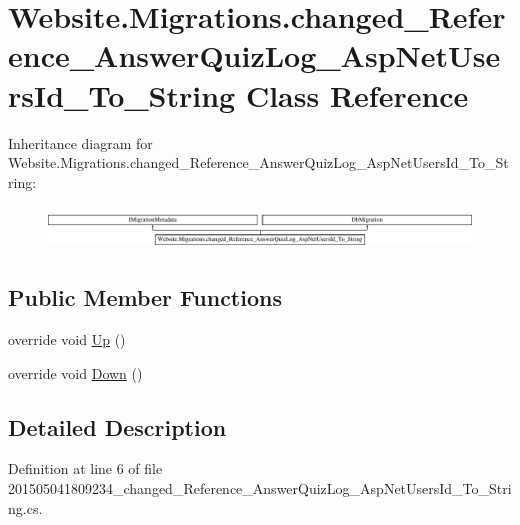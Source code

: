 \hypertarget{class_website_1_1_migrations_1_1changed___reference___answer_quiz_log___asp_net_users_id___to___string}{}\section{Website.\+Migrations.\+changed\+\_\+\+Reference\+\_\+\+Answer\+Quiz\+Log\+\_\+\+Asp\+Net\+Users\+Id\+\_\+\+To\+\_\+\+String Class Reference}
\label{class_website_1_1_migrations_1_1changed___reference___answer_quiz_log___asp_net_users_id___to___string}
Inheritance diagram for Website.\+Migrations.\+changed\+\_\+\+Reference\+\_\+\+Answer\+Quiz\+Log\+\_\+\+Asp\+Net\+Users\+Id\+\_\+\+To\+\_\+\+String\+:\begin{figure}[H]
\begin{center}
\leavevmode
\includegraphics[height=1.133603cm]{class_website_1_1_migrations_1_1changed___reference___answer_quiz_log___asp_net_users_id___to___string}
\end{center}
\end{figure}
\subsection*{Public Member Functions}
\begin{DoxyCompactItemize}
\item 
override void \hyperlink{class_website_1_1_migrations_1_1changed___reference___answer_quiz_log___asp_net_users_id___to___string_a76a1e7d43c384403435181c8c264e5d4}{Up} ()
\item 
override void \hyperlink{class_website_1_1_migrations_1_1changed___reference___answer_quiz_log___asp_net_users_id___to___string_a204718fd312c1289a6bce10a562f4baa}{Down} ()
\end{DoxyCompactItemize}


\subsection{Detailed Description}


Definition at line 6 of file 201505041809234\+\_\+changed\+\_\+\+Reference\+\_\+\+Answer\+Quiz\+Log\+\_\+\+Asp\+Net\+Users\+Id\+\_\+\+To\+\_\+\+String.\+cs.



